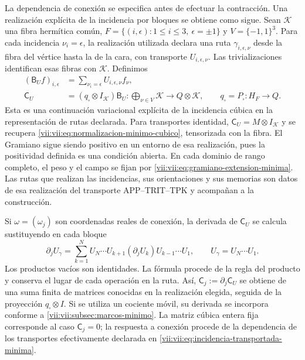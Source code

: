 La dependencia de conexión se especifica antes de efectuar la
contracción. Una realización explícita de la incidencia por bloques
se obtiene como sigue. Sean \(\mathcal K\) una fibra hermítica común,
\(F=\{(i,\epsilon):1\leq i\leq3,\ \epsilon=\pm1\}\) y
\(V=\{-1,1\}^3\). Para cada incidencia \(\nu_i=\epsilon\),
la realización utilizada declara una ruta \(\gamma_{i,\epsilon,\nu}\)
desde la fibra del vértice hasta la de la cara, con transporte
\(U_{i,\epsilon,\nu}\). Las trivializaciones identifican esas fibras
con \(\mathcal K\). Definimos
\begin{equation}
 \begin{split}
 (\mathsf B_Uf)_{i,\epsilon}
   &=\sum_{\nu_i=\epsilon}U_{i,\epsilon,\nu}f_\nu,\\
 \mathsf C_U&=(q_\square\otimes I_{\mathcal K})\mathsf B_U:
   \bigoplus_{\nu\in V}\mathcal K\longrightarrow Q\otimes\mathcal K,
 \qquad q_\square=P_\square:H_F\to Q.
 \end{split}
 \label{vii:vii:eq:incidencia-transportada-minima}
\end{equation}
Esta es una continuación variacional explícita de la incidencia cúbica
en la representación de rutas declarada. Para transportes identidad,
\(\mathsf C_U=M\otimes I_{\mathcal K}\) y se recupera
\eqref{vii:vii:eq:normalizacion-minimo-cubico}, tensorizada con la fibra.
El Gramiano sigue siendo positivo en un entorno de esa realización,
pues la positividad definida es una condición abierta. En cada dominio
de rango completo, el peso y el campo se fijan por
\eqref{vii:vii:eq:gramiano-extension-minima}. Las rutas que realizan las
incidencias, sus orientaciones y sus memorias son datos de esa
realización del transporte APP--TRIT--TPK y acompañan a la construcción.

Si \(\omega=(\omega_j)\) son coordenadas reales de conexión,
la derivada de \(\mathsf C_U\) se calcula sustituyendo en cada bloque
\begin{equation}
 \partial_j U_\gamma
 =\sum_{k=1}^{N}
    U_N\cdots U_{k+1}(\partial_jU_k)U_{k-1}\cdots U_1,
 \qquad U_\gamma=U_N\cdots U_1.
 \label{vii:vii:eq:derivada-incidencia-rutas}
\end{equation}
Los productos vacíos son identidades. La fórmula procede de la regla
del producto y conserva el lugar de cada operación en la ruta.
Así, \(\mathsf C_j:=\partial_j\mathsf C_U\) se obtiene de una
suma finita de matrices conocidas en la realización elegida, seguida
de la proyección \(q_\square\otimes I\). Si se utiliza un cociente
móvil, su derivada se incorpora conforme a
\ref{vii:vii:subsec:marcos-minimo}. La matriz cúbica entera fija corresponde
al caso \(\mathsf C_j=0\); la respuesta a conexión procede de la
dependencia de los transportes efectivamente declarada en
\eqref{vii:vii:eq:incidencia-transportada-minima}.

